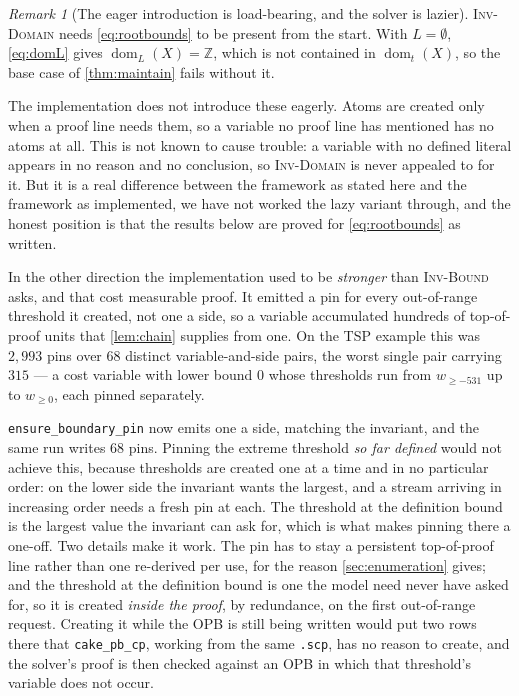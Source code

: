 \documentclass[11pt,a4paper]{article}
\theoremstyle{plain}
\theoremstyle{definition}
\theoremstyle{remark}
\newtheorem*{remark}{Remark}
\newcommand{\fname}[1]{\ensuremath{\operatorname{#1}}}
\newcommand{\dm}{\fname{dom}}
\newcommand{\atge}[2]{#1_{\geq #2}}
\newcommand{\inv}[1]{\textnormal{\textsc{Inv-#1}}}
\newcommand{\code}[1]{\texttt{#1}}
\newcommand{\invDomain}{\inv{Domain}}
\begin{document}
\begin{remark}[The eager introduction is load-bearing, and the solver is lazier]
\label{rem:lazypins}
\invDomain{} needs \cref{eq:rootbounds} to be present from the start.  With
$L=\emptyset$, \cref{eq:domL} gives $\dm_L(X)=\mathbb Z$, which is not contained
in $\dm_t(X)$, so the base case of \cref{thm:maintain} fails without it.

The implementation does not introduce these eagerly.  Atoms are created only
when a proof line needs them, so a variable no proof line has mentioned has no
atoms at all.  This is not known to cause trouble: a variable with no defined
literal appears in no reason and no conclusion, so \invDomain{} is never
appealed to for it.  But it is a real difference between the framework as
stated here and the framework as implemented, we have not worked the lazy
variant through, and the honest position is that the results below are proved
for \cref{eq:rootbounds} as written.

In the other direction the implementation used to be \emph{stronger} than
\inv{Bound} asks, and that cost measurable proof.  It emitted a pin for every
out-of-range threshold it created, not one a side, so a variable accumulated
hundreds of top-of-proof units that \cref{lem:chain} supplies from one.  On the
TSP example this was $2{,}993$ pins over $68$ distinct variable-and-side pairs,
the worst single pair carrying $315$ --- a cost variable with lower bound $0$
whose thresholds run from $\atge{w}{-531}$ up to $\atge{w}{0}$, each pinned
separately.

\code{ensure\_boundary\_pin} now emits one a side, matching the invariant, and
the same run writes $68$ pins.  Pinning the extreme threshold \emph{so far
defined} would not achieve this, because thresholds are created one at a time
and in no particular order: on the lower side the invariant wants the largest,
and a stream arriving in increasing order needs a fresh pin at each.  The
threshold at the definition bound is the largest value the invariant can ask
for, which is what makes pinning there a one-off.  Two details make it work.
The pin has to stay a persistent top-of-proof line rather than one re-derived
per use, for the reason \cref{sec:enumeration} gives; and the threshold at the
definition bound is one the model need never have asked for, so it is created
\emph{inside the proof}, by redundance, on the first out-of-range request.
Creating it while the OPB is still being written would put two rows there that
\code{cake\_pb\_cp}, working from the same \code{.scp}, has no reason to create,
and the solver's proof is then checked against an OPB in which that threshold's
variable does not occur.
\end{remark}
\end{document}
